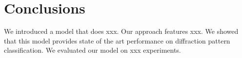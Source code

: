 \section{Conclusions}

{
\color{gray} 

We introduced a model that does xxx.  Our approach features xxx. We showed that
this model provides state of the art performance on diffraction pattern
classification.  We evaluated our model on xxx experiments.  

}
